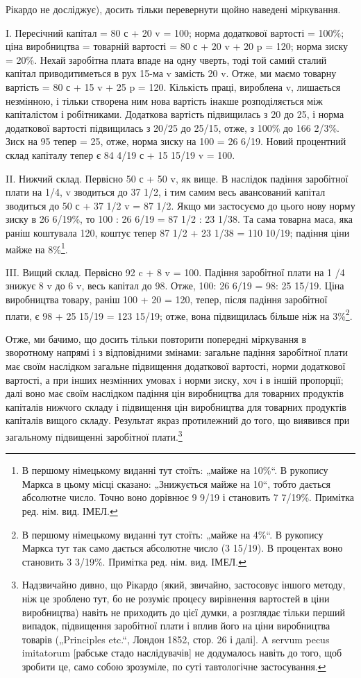 Рікардо не досліджує), досить тільки перевернути щойно наведені
міркування.

I. Пересічний капітал = 80 с + 20 v = 100; норма додаткової
вартості = 100\%; ціна виробництва = товарній вартості = 80 с +
20 v + 20 p = 120; норма зиску = 20\%. Нехай заробітна плата
впаде на одну чверть, тоді той самий сталий капітал приводитиметься
в рух 15-ма v замість 20 v. Отже, ми маємо товарну
вартість = 80 с + 15 v + 25 p = 120. Кількість праці, вироблена v,
лишається  незмінною, і тільки створена ним нова вартість інакше
розподіляється між капіталістом і робітниками. Додаткова вартість
підвищилась з 20 до 25, і норма додаткової вартості
підвищилась з 20/25 до 25/15, отже, з 100\% до 166 2/3\%. Зиск на 95 тепер = 25,
отже, норма зиску на 100 = 26 6/19. Новий процентний склад
капіталу тепер є 84 4/19 с + 15 15/19 v = 100.

II. Нижчий склад. Первісно 50 с + 50 v, як вище. В наслідок
падіння заробітної плати на 1/4, v зводиться до 37 1/2, і тим самим
весь авансований капітал зводиться до 50 с + 37 1/2 v = 87 1/2. Якщо
ми застосуємо до цього нову норму зиску в 26 6/19\%, то
100 : 26 6/19 = 87 1/2 : 23 1/38. Та сама товарна маса, яка раніш коштувала
120, коштує тепер 87 1/2 + 23 1/38 = 110 10/19; падіння ціни майже на 8\%\footnote*{
В першому німецькому виданні тут стоїть: „майже на 10\%“. В рукопису
Маркса в цьому місці сказано: „Знижується майже на 10“, тобто дається абсолютне число. Точно воно
дорівнює 9 9/19 і становить 7 7/19\%. Примітка ред. нім. вид. ІМЕЛ.
}.

III. Вищий склад. Первісно 92 c + 8 v = 100. Падіння заробітної
плати на 1 /4 знижує 8 v до 6 v, весь капітал до 98. Отже,
100: 26 6/19 = 98: 25 15/19. Ціна виробництва товару, раніш 100 + 20 = 120,
тепер, після падіння заробітної плати, є 98 + 25 15/19 = 123 15/19;
отже, вона підвищилась більше ніж на 3\%\footnote*{
В першому німецькому виданні тут стоїть: „майже на 4\%“. В рукопису
Маркса тут так само дається абсолютне число (3 15/19). В процентах воно становить
3 3/19\%. Примітка ред. нім. вид. ІМЕЛ.
}.

Отже, ми бачимо, що досить тільки повторити попередні міркування в зворотному напрямі і з
відповідними змінами: загальне падіння заробітної плати має своїм наслідком загальне підвищення
додаткової вартості, норми додаткової вартості, а при інших незмінних умовах і норми зиску, хоч і в
іншій пропорції; далі воно має своїм наслідком падіння цін виробництва для товарних продуктів
капіталів нижчого складу і підвищення цін виробництва для товарних продуктів капіталів вищого
складу. Результат якраз протилежний до того, що  виявився при загальному підвищенні заробітної
плати.\footnote{
Надзвичайно дивно, що Рікардо (який, звичайно, застосовує іншого
методу, ніж це зроблено тут, бо не розуміє процесу вирівнення вартостей в ціни виробництва) навіть
не приходить до цієї думки, а розглядає тільки перший випадок, підвищення заробітної плати і вплив
його на ціни виробництва товарів („Principles etc.“, Лондон 1852, стор. 26 і далі]. A servum pecus
imitatorum [рабське стадо наслідувачів] не додумалось навіть до того, щоб зробити
це, само собою зрозуміле, по суті тавтологічне застосування.
}